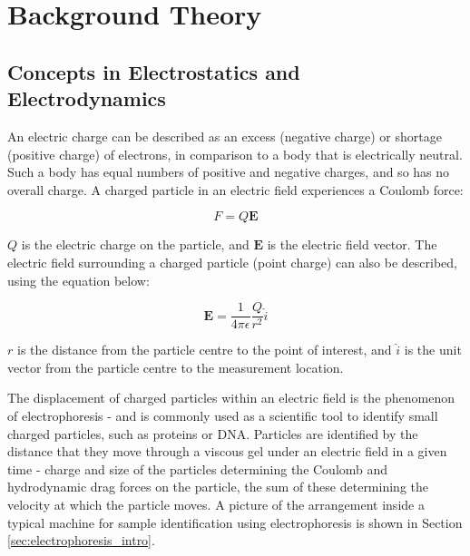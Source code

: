 \chapter{Background Theory}
\label{Chapter:Background}

\section{Concepts in Electrostatics and Electrodynamics}
\label{sec:concepts_in_electrostatics_and_electrodynamics}

An electric charge can be described as an excess (negative charge) or shortage (positive charge) of electrons, in comparison to a body that is electrically neutral. Such a body has equal numbers of positive and negative charges, and so has no overall charge. A charged particle in an electric field experiences a Coulomb force:

\begin{equation}
 F=Q \textbf{E}
\label{eqn:force_on_point_charge}
\end{equation}

$Q$ is the electric charge on the particle, and $\textbf{E}$ is the electric field vector. The electric field surrounding a charged particle (point charge) can also be described, using the equation below:

\begin{equation}
 \textbf{E}=\dfrac{1}{4\pi\epsilon}\dfrac{Q}{r^{2}}\hat{i}
\label{eqn:field_around_point_charge}
\end{equation}

$r$ is the distance from the particle centre to the point of interest, and $\hat{i}$ is the unit vector from the particle centre to the measurement location.

The displacement of charged particles within an electric field is the phenomenon of electrophoresis - and is commonly used as a scientific tool to identify small charged particles, such as proteins or DNA. Particles are identified by the distance that they move through a viscous gel under an electric field in a given time - charge and size of the particles determining the Coulomb and hydrodynamic drag forces on the particle, the sum of these determining the velocity at which the particle moves. A picture of the arrangement inside a typical machine for sample identification using electrophoresis is shown in Section \ref{sec:electrophoresis_intro}.

